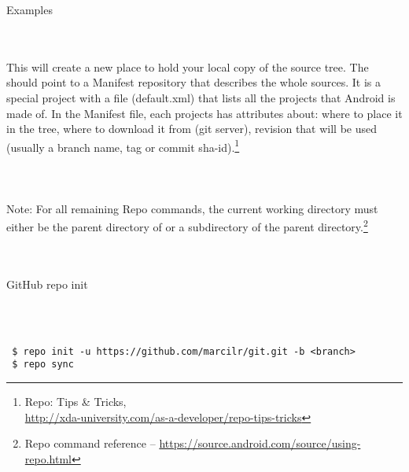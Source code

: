 \noindent \begin{bf}Examples\end{bf}
\\
\\
This will create a new place to hold your local copy of the source
tree.  The  should point to a Manifest repository that
describes the whole sources.  It is a special project with a file
(default.xml) that lists all the projects that Android is made of.
In the Manifest file, each projects has attributes about: where to
place it in the tree, where to download it from (git server),
revision that will be used (usually a branch name, tag or commit
sha-id).\footnote{Repo: Tips \& Tricks,\\
\href{http://xda-university.com/as-a-developer/repo-tips-tricks}{http://xda-university.com/as-a-developer/repo-tips-tricks}}
\\
\\
\indent{}
\\
\\
\noindent Note: For all remaining Repo commands, the current working
directory must either be the parent directory of 
or a subdirectory of the parent directory.\footnote{Repo command reference --
\href{https://source.android.com/source/using-repo.html\#forall}{https://source.android.com/source/using-repo.html}}\\
\\
\\


\newpage
\noindent \begin{bf}GitHub repo init\end{bf}
\\
\\
\begin{verbatim}
 $ repo init -u https://github.com/marcilr/git.git -b <branch>
 $ repo sync
\end{verbatim}

